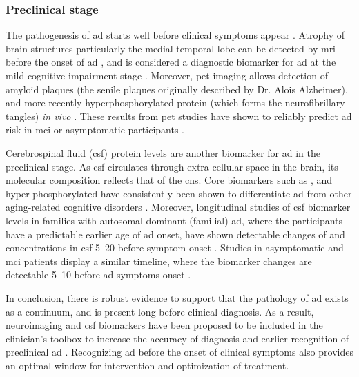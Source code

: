 \subsubsection{Preclinical stage \label{preclinical}}

The pathogenesis of \gls{ad} starts well before clinical symptoms appear \citep{dubois16}. Atrophy of brain structures particularly the medial temporal lobe can be detected by \gls{mri} before the onset of \gls{ad} \citep{jack92, scheltens92, chetelat03}, and is considered a diagnostic biomarker for \gls{ad} at the mild cognitive impairment stage \citep{jack99}. Moreover, \gls{pet} imaging allows detection of amyloid plaques (the senile plaques originally described by Dr. Alois Alzheimer), and more recently hyperphosphorylated \atau{} protein (which forms the neurofibrillary tangles) \textit{in vivo} \citep{mathis03, maruyama13, okamura13}. These results from \gls{pet} studies have shown to reliably predict \gls{ad} risk in \gls{mci} or asymptomatic participants \citep{klunk04, chien14, sepulcre16}.

Cerebrospinal fluid (\gls{csf}) protein levels are another biomarker for \gls{ad} in the preclinical stage. As \gls{csf} circulates through extra-cellular space in the brain, its molecular composition reflects that of the \gls{cns}. Core biomarkers such as \abeta{}, \atau{} and hyper-phosphorylated \atau{} have consistently been shown to differentiate \gls{ad} from other aging-related cognitive disorders \citep{blennow10}. Moreover, longitudinal studies of \gls{csf} biomarker levels in families with autosomal-dominant (familial) \gls{ad}, where the participants have a predictable earlier age of \gls{ad} onset, have shown detectable changes of \abeta{} and \atau{} concentrations in \gls{csf} \SIrange{5}{20}{\year} before symptom onset \citep{bateman12, fagan14}. Studies in asymptomatic and \gls{mci} patients display a similar timeline, where the biomarker changes are detectable \SIrange{5}{10}{\year} before \gls{ad} symptoms onset \citep{buchhave12, vos13}. 

In conclusion, there is robust evidence to support that the pathology of \gls{ad} exists as a continuum, and is present long before clinical diagnosis. As a result, neuroimaging and \gls{csf} biomarkers have been proposed to be included in the clinician's toolbox to increase the accuracy of diagnosis and earlier recognition of preclinical \gls{ad} \citep{ad16}. Recognizing \gls{ad} before the onset of clinical symptoms also provides an optimal window for intervention and optimization of treatment. 


